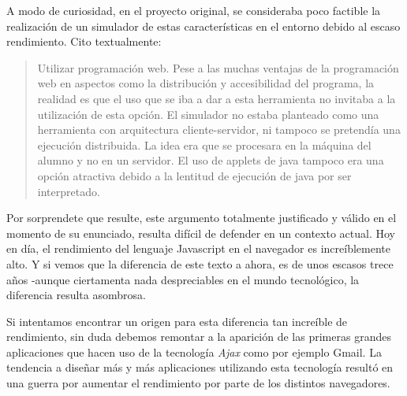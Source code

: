 A modo de curiosidad, en el proyecto original, se consideraba poco factible la realización de 
un simulador de estas características en el entorno debido al escaso rendimiento. Cito textualmente:

\begin{quotation}
Utilizar programación web. Pese a las muchas ventajas de la programación
web en aspectos como la distribución y accesibilidad del programa, la realidad
es que el uso que se iba a dar a esta herramienta no invitaba a la utilización de
esta opción. El simulador no estaba planteado como una herramienta con
arquitectura cliente-servidor, ni tampoco se pretendía una ejecución distribuida.
La idea era que se procesara en la máquina del alumno y no en un servidor. El
uso de applets de java tampoco era una opción atractiva debido a la lentitud de
ejecución de java por ser interpretado.
\end{quotation} \cite{SIMDE}

\bigskip
Por sorprendete que resulte, este argumento totalmente justificado y válido en el momento
de su enunciado, resulta difícil de defender en un contexto actual. Hoy en día,
el rendimiento del lenguaje Javascript en el navegador es increíblemente alto. Y si vemos que la diferencia 
de este texto a ahora, es de unos escasos trece años -aunque ciertamenta nada despreciables en el mundo 
tecnológico, la diferencia resulta asombrosa.
 
\bigskip
Si intentamos encontrar un origen para esta diferencia tan increíble de rendimiento, sin duda
debemos remontar a la aparición de las primeras grandes aplicaciones que hacen uso de la tecnología
\textit{Ajax} como por ejemplo Gmail. La tendencia a diseñar más y más aplicaciones utilizando esta
tecnología resultó en una guerra por aumentar el rendimiento por parte de los distintos navegadores. \cite{EvolutionJavascript}
